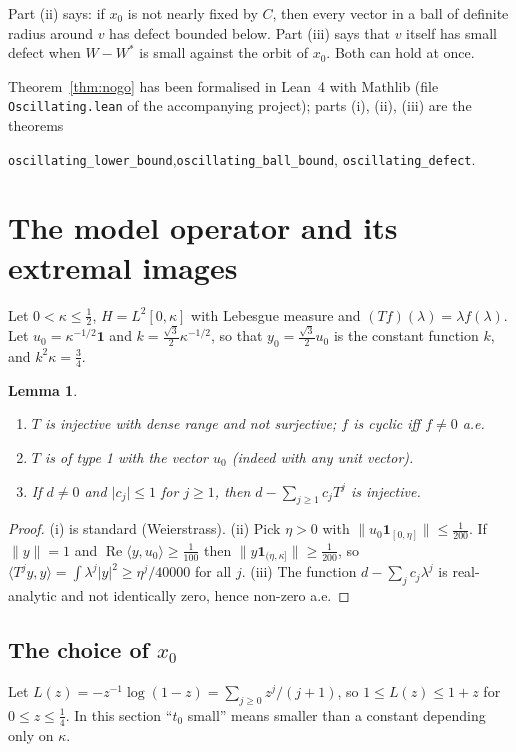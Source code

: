 \documentclass[11pt]{article}
\newtheorem{lemma}[theorem]{Lemma}
\theoremstyle{definition}
\newcommand{\ip}[2]{\langle #1,#2\rangle}
\newcommand{\norm}[1]{\lVert #1\rVert}
\newcommand{\abs}[1]{\lvert #1\rvert}
\newcommand{\re}{\operatorname{Re}}
\newcommand{\one}{\mathbf 1}
\begin{document}
Part (ii) says: if $x_0$ is not nearly fixed by $C$, then every vector in a ball of definite
radius around $v$ has defect bounded below. Part (iii) says that $v$ itself has small defect
when $W-W^*$ is small against the orbit of $x_0$. Both can hold at once.

Theorem~\ref{thm:nogo} has been formalised in Lean~4 with Mathlib (file
\texttt{Oscillating.lean} of the accompanying project); parts (i), (ii), (iii) are the
theorems
\begin{center}
\texttt{oscillating\_lower\_bound},\quad\texttt{oscillating\_ball\_bound},\quad
\texttt{oscillating\_defect}.
\end{center}

\section{The model operator and its extremal images}\label{sec:model}

Let $0<\kappa\le\frac12$, $H=L^2[0,\kappa]$ with Lebesgue measure and
$(Tf)(\lambda)=\lambda f(\lambda)$. Let $u_0=\kappa^{-1/2}\one$ and
$k=\frac{\sqrt3}2\kappa^{-1/2}$, so that $y_0=\frac{\sqrt3}2u_0$ is the constant function $k$,
and $k^2\kappa=\frac34$.

\begin{lemma}\label{lem:model}
\begin{enumerate}[label=\textup{(\roman*)}]
\item $T$ is injective with dense range and not surjective; $f$ is cyclic iff $f\ne0$ a.e.
\item $T$ is of type 1 with the vector $u_0$ (indeed with any unit vector).
\item If $d\ne0$ and $\abs{c_j}\le1$ for $j\ge1$, then $d-\sum_{j\ge1}c_jT^j$ is injective.
\end{enumerate}
\end{lemma}
\begin{proof}
(i) is standard (Weierstrass). (ii) Pick $\eta>0$ with
$\norm{u_0\one_{[0,\eta]}}\le\frac1{200}$. If $\norm y=1$ and
$\re\ip y{u_0}\ge\frac1{100}$ then $\norm{y\one_{(\eta,\kappa]}}\ge\frac1{200}$, so
$\ip{T^jy}{y}=\int\lambda^j\abs y^2\ge\eta^j/40000$ for all $j$. (iii) The function
$d-\sum_jc_j\lambda^j$ is real-analytic and not identically zero, hence non-zero a.e.
\end{proof}

\subsection{\texorpdfstring{The choice of $x_0$}{The choice of x0}}
Let $L(z)=-z^{-1}\log(1-z)=\sum_{j\ge0}z^j/(j+1)$, so $1\le L(z)\le1+z$ for $0\le z\le\frac14$.
In this section ``$t_0$ small'' means smaller than a constant depending only on $\kappa$.
\end{document}
